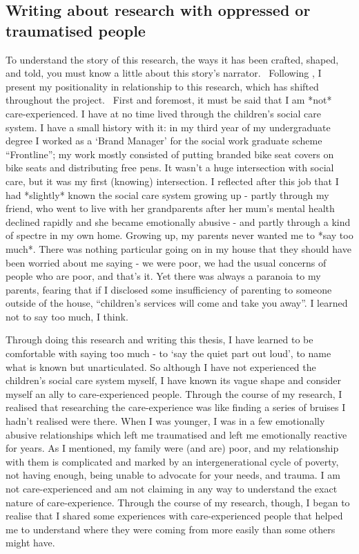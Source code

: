 \subsection{Writing about research with oppressed or traumatised people}
To understand the story of this research, the ways it has been crafted, shaped, and told, you must know a little about this story’s narrator. ~Following \cite{rose_situating_1997}, I present my positionality in relationship to this research, which has shifted throughout the project.~ First and foremost, it must be said that I am *not* care-experienced. I have at no time lived through the children’s social care system. I have a small history with it: in my third year of my undergraduate degree I worked as a ‘Brand Manager’ for the social work graduate scheme “Frontline”; my work mostly consisted of putting branded bike seat covers on bike seats and distributing free pens. It wasn’t a huge intersection with social care, but it was my first (knowing) intersection. I reflected after this job that I had *slightly* known the social care system growing up - partly through my friend, who went to live with her grandparents after her mum’s mental health declined rapidly and she became emotionally abusive - and partly through a kind of spectre in my own home. Growing up, my parents never wanted me to *say too much*. There was nothing particular going on in my house that they should have been worried about me saying - we were poor,  we had the usual concerns of people who are poor, and that’s it. Yet there was always a paranoia to my parents, fearing that if I disclosed some insufficiency of parenting to someone outside of the house, “children’s services will come and take you away”. I learned not to say too much, I think.

Through doing this research and writing this thesis, I have learned to be comfortable with saying too much - to ‘say the quiet part out loud’, to name what is known but unarticulated. So although I have not experienced the children’s social care system myself, I have known its vague shape and consider myself an ally to care-experienced people. Through the course of my research, I realised that researching the care-experience was like finding a series of bruises I hadn’t realised were there. When I was younger, I was in a few emotionally abusive relationships which left me traumatised and left me emotionally reactive for years. As I mentioned, my family were (and are) poor, and my relationship with them is complicated and marked by an intergenerational cycle of poverty, not having enough, being unable to advocate for your needs, and trauma. I am not care-experienced and am not claiming in any way to understand the exact nature of care-experience. Through the course of my research, though, I began to realise that I shared some experiences with care-experienced people that helped me to understand where they were coming from more easily than some others might have. 

